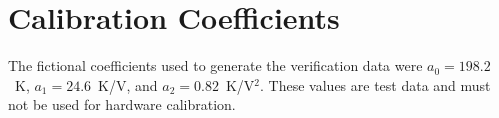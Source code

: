 \chapter{Calibration Coefficients}
The fictional coefficients used to generate the verification data were
$a_0=198.2$~K, $a_1=24.6$~K/V, and $a_2=0.82$~K/V$^2$. These values are test data
and must not be used for hardware calibration.

